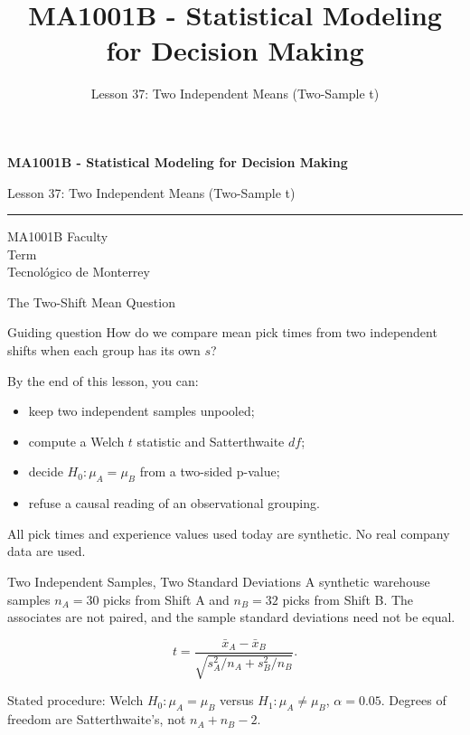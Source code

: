 \documentclass[aspectratio=169,10pt,english]{beamer}
\title{MA1001B - Statistical Modeling for Decision Making}
\subtitle{Lesson 37: Two Independent Means (Two-Sample t)}
\author{}
\institute{Tecnol\'ogico de Monterrey}
\date{}
\begin{document}
\begin{frame}[plain]
  \vspace{1.2cm}
  {\Large\bfseries MA1001B - Statistical Modeling for Decision Making\par}
  \vspace{0.7cm}
  {\large Lesson 37: Two Independent Means (Two-Sample t)\par}
  \vspace{0.7cm}
  {\color{TecRojo}\rule{\textwidth}{1.2pt}}
  \vspace{0.8cm}

  MA1001B Faculty\\[0.3cm]
  Term\\[0.3cm]
  Tecnol\'ogico de Monterrey
\end{frame}

\begin{frame}{The Two-Shift Mean Question}
  \begin{alertblock}{Guiding question}
    How do we compare mean pick times from two independent shifts when each
    group has its own $s$?
  \end{alertblock}

  \vspace{0.6em}
  By the end of this lesson, you can:
  \begin{itemize}
    \item keep two independent samples unpooled;
    \item compute a Welch $t$ statistic and Satterthwaite $df$;
    \item decide $H_0:\mu_A=\mu_B$ from a two-sided p-value;
    \item refuse a causal reading of an observational grouping.
  \end{itemize}

  \vfill
  \scriptsize All pick times and experience values used today are synthetic. No real company data are used.
\end{frame}

\begin{frame}{Two Independent Samples, Two Standard Deviations}
  \small
  A synthetic warehouse samples $n_A=30$ picks from Shift A and $n_B=32$
  picks from Shift B. The associates are not paired, and the sample
  standard deviations need not be equal.

  \[
    t=\frac{\bar{x}_A-\bar{x}_B}{\sqrt{s_A^2/n_A+s_B^2/n_B}}.
  \]

  \begin{exampleblock}{Stated procedure: Welch}
    $H_0:\mu_A=\mu_B$ versus $H_1:\mu_A\neq\mu_B$, $\alpha=0.05$. Degrees of
    freedom are Satterthwaite's, not $n_A+n_B-2$.
  \end{exampleblock}
\end{frame}
\end{document}
